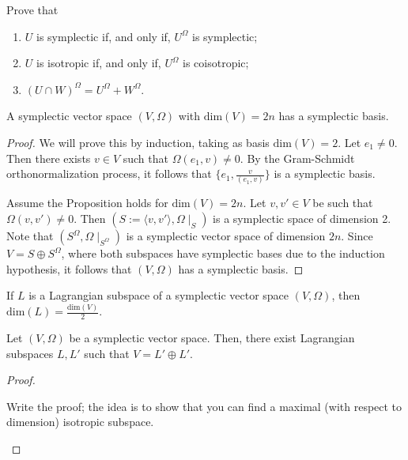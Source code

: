 \documentclass[12pt]{book}
\begin{document}
\begin{Exc}
    Prove that
    \begin{enumerate}[label=\ExcLbl]
    
        \item $U$ is symplectic if, and only if, $U^\Omega$ is symplectic;

        \item $U$ is isotropic if, and only if, $U^\Omega$ is coisotropic;

        \item $(U\cap W)^\Omega = U^\Omega + W^\Omega$.
    \end{enumerate}
\end{Exc}

\begin{Prop}[]\label{Prop: }
    A symplectic vector space $(V,\Omega)$ with $\text{dim}(V)=2n$ has a symplectic basis.

    \begin{proof}
    
        We will prove this by induction, taking as basis $\text{dim}(V)=2$. Let $e_1\neq 0$. Then there exists $v\in V$ such that $\Omega(e_1,v)\neq 0$. By the Gram-Schmidt orthonormalization process, it follows that $\{e_1, \frac{v}{(e_1,v)}\}$ is a symplectic basis.

        Assume the Proposition holds for $\text{dim}(V)=2n$. Let $v,v'\in V$ be such that $\Omega(v,v')\neq 0$. Then $(S := \langle v,v' \rangle, \Omega\mid_S)$ is a symplectic space of dimension 2. Note that $(S^\Omega, \Omega\mid_{S^\Omega})$ is a symplectic vector space of dimension $2n$. Since $V=S\oplus S^\Omega$, where both subspaces have symplectic bases due to the induction hypothesis, it follows that $(V,\Omega)$ has a symplectic basis.
    \end{proof}
\end{Prop}

\begin{Rmk}\label{Rmk: Dimension of Lagrangian subspaces}
    If $L$ is a Lagrangian subspace of a symplectic vector space $(V,\Omega)$, then $\text{dim}(L) = \frac{\text{dim}(V)}{2}$.
\end{Rmk}

\begin{Prop}\label{Prop: Lagrangian split}
    Let $(V,\Omega)$ be a symplectic vector space. Then, there exist Lagrangian subspaces $L,L'$ such that $V=L'\oplus L'$.

    \begin{proof}
    
        \begin{Exc}
        Write the proof; the idea is to show that you can find a maximal (with respect to dimension) isotropic subspace.
        \end{Exc}
        
    \end{proof}
\end{Prop}
\end{document}
